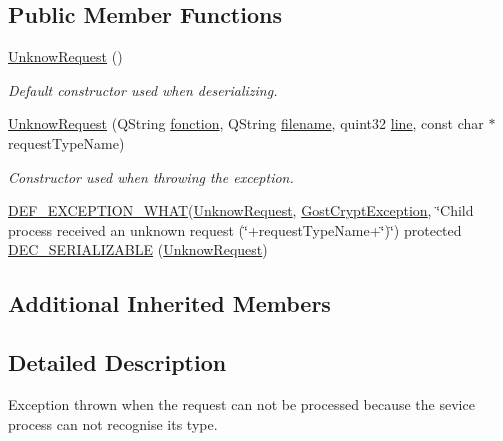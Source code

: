 \subsection*{Public Member Functions}
\begin{DoxyCompactItemize}
\item 
\hyperlink{class_gost_crypt_1_1_core_1_1_unknow_request_abe50faa377da57ba0a3afbc92c3a6016}{Unknow\+Request} ()
\begin{DoxyCompactList}\small\item\em Default constructor used when deserializing. \end{DoxyCompactList}\item 
\hyperlink{class_gost_crypt_1_1_core_1_1_unknow_request_aab8e3b9ad5a9df302c09c69c8d2765ab}{Unknow\+Request} (Q\+String \hyperlink{class_gost_crypt_1_1_gost_crypt_exception_a29b8c93d5efbb1ff369107385725a939}{fonction}, Q\+String \hyperlink{class_gost_crypt_1_1_gost_crypt_exception_a749a12375f4ba9d502623b99d8252f38}{filename}, quint32 \hyperlink{class_gost_crypt_1_1_gost_crypt_exception_abf506d911f12a4e969eea500f90bd32c}{line}, const char $\ast$request\+Type\+Name)
\begin{DoxyCompactList}\small\item\em Constructor used when throwing the exception. \end{DoxyCompactList}\item 
\hyperlink{_gost_crypt_exception_8h_a5bc1e1c6c9d6f46c84eeba49e33355f9}{D\+E\+F\+\_\+\+E\+X\+C\+E\+P\+T\+I\+O\+N\+\_\+\+W\+H\+AT}(\hyperlink{class_gost_crypt_1_1_core_1_1_unknow_request}{Unknow\+Request}, \hyperlink{class_gost_crypt_1_1_gost_crypt_exception}{Gost\+Crypt\+Exception}, \char`\"{}Child process received an unknown request (\char`\"{}+request\+Type\+Name+\char`\"{})\char`\"{}) protected \hyperlink{class_gost_crypt_1_1_core_1_1_unknow_request_a37f756742ac6e50f7f05d62754457c4e}{D\+E\+C\+\_\+\+S\+E\+R\+I\+A\+L\+I\+Z\+A\+B\+LE} (\hyperlink{class_gost_crypt_1_1_core_1_1_unknow_request}{Unknow\+Request})
\end{DoxyCompactItemize}
\subsection*{Additional Inherited Members}


\subsection{Detailed Description}
Exception thrown when the request can not be processed because the sevice process can not recognise its type. 

